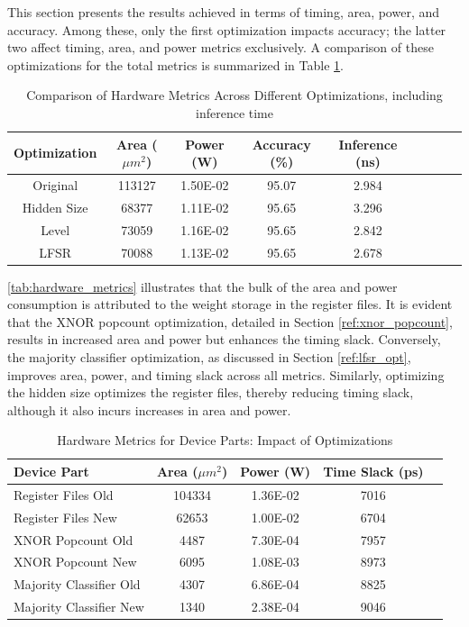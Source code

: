 \documentclass[conference]{IEEEtran}
\begin{document}
This section presents the results achieved in terms of timing, area, power, and accuracy. Among these, only the first optimization impacts accuracy; the latter two affect timing, area, and power metrics exclusively. A comparison of these optimizations for the total metrics is summarized in Table \ref{tab:optimization_metrics}. 


\begin{table}[h]
    \centering
    \caption{Comparison of Hardware Metrics Across Different Optimizations, including inference time}
    \label{tab:optimization_metrics}
    \begin{tabular}{@{}ccccccccc@{}}
        \toprule
        \textbf{Optimization} & \textbf{Area ($\mu m^2$)} & \textbf{Power (W)} & \textbf{Accuracy (\%)} & \textbf{Inference (ns)}  \\
        \midrule
        Original & 113127 & 1.50E-02 & 95.07 & 2.984 \\
        Hidden Size & 68377 & 1.11E-02 & 95.65 & 3.296 \\
        Level & 73059 & 1.16E-02 & 95.65 & 2.842 \\
        LFSR & 70088 & 1.13E-02 & 95.65 & 2.678 \\
        \bottomrule
    \end{tabular}
\end{table}

\autoref{tab:hardware_metrics} illustrates that the bulk of the area and power consumption is attributed to the weight storage in the register files. It is evident that the XNOR popcount optimization, detailed in Section \ref{ref:xnor_popcount}, results in increased area and power but enhances the timing slack. Conversely, the majority classifier optimization, as discussed in Section \ref{ref:lfsr_opt}, improves area, power, and timing slack across all metrics. Similarly, optimizing the hidden size optimizes the register files, thereby reducing timing slack, although it also incurs increases in area and power.

\begin{table}[h]
    \centering
    \caption{Hardware Metrics for Device Parts: Impact of Optimizations}
    \label{tab:hardware_metrics}
    \begin{tabular}{@{}lcccc@{}}
        \toprule
        \textbf{Device Part} & \textbf{Area (\(\mu m^2\))} & \textbf{Power (W)} & \textbf{Time Slack (ps)} \\
        \midrule
        Register Files Old & 104334 & 1.36E-02 & 7016 \\
        Register Files New & 62653 & 1.00E-02 & 6704 \\
        XNOR Popcount Old & 4487 & 7.30E-04 & 7957 \\
        XNOR Popcount New & 6095 & 1.08E-03 & 8973 \\
        Majority Classifier Old & 4307 & 6.86E-04 & 8825 \\
        Majority Classifier New & 1340 & 2.38E-04 & 9046 \\
        \bottomrule
    \end{tabular}
\end{table}
\end{document}
